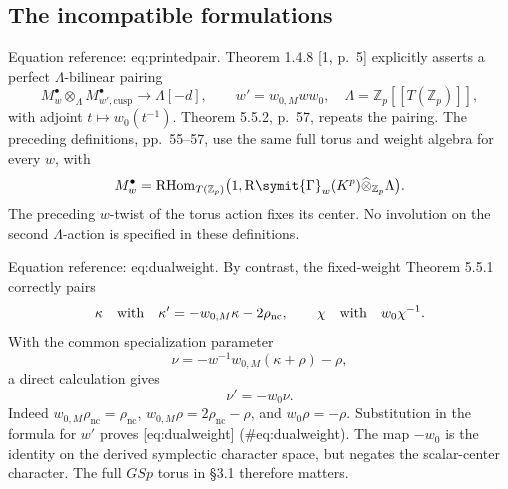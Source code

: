 \documentclass[10pt]{article}
\begin{document}
\subsection*{The incompatible formulations}
Equation reference: eq:printedpair. Theorem 1.4.8 [1, p. 5] explicitly asserts a perfect \(\Lambda\)-bilinear pairing \[
 M_w^\bullet\otimes_\Lambda M_{w',\mathrm{cusp}}^\bullet
 \longrightarrow\Lambda[-d],
 \qquad w'=w_{0,M}ww_0,\quad
 \Lambda=\mathbb Z_p[[T(\mathbb Z_p)]],\] with adjoint \(t\mapsto w_0(t^{-1})\). Theorem 5.5.2, p. 57, repeats the pairing. The preceding definitions, pp. 55–57, use the same full torus and weight algebra for every \(w\), with \[M_w^\bullet=\operatorname{RHom}_{T(\mathbb Z_p)}
 \bigl(1,\operatorname{R\symit{\Gamma}}_w(K^p)\widehat\otimes_{\mathbb Z_p}\Lambda\bigr).\] The preceding \(w\)-twist of the torus action fixes its center. No involution on the second \(\Lambda\)-action is specified in these definitions.\par
Equation reference: eq:dualweight. By contrast, the fixed-weight Theorem 5.5.1 correctly pairs \[\kappa \quad\hbox{with}\quad
 \kappa'=-w_{0,M}\kappa-2\rho_{\mathrm{nc}},
 \qquad \chi\quad\hbox{with}\quad w_0\chi^{-1}.\] With the common specialization parameter \[\nu=-w^{-1}w_{0,M}(\kappa+\rho)-\rho,\] a direct calculation gives \[
 \nu'=-w_0\nu.\] Indeed \(w_{0,M}\rho_{\mathrm{nc}}=\rho_{\mathrm{nc}}\), \(w_{0,M}\rho=2\rho_{\mathrm{nc}}-\rho\), and \(w_0\rho=-\rho\). Substitution in the formula for \(w'\) proves [eq:dualweight] (\#eq:dualweight). The map \(-w_0\) is the identity on the derived symplectic character space, but negates the scalar-center character. The full \(GSp\) torus in §3.1 therefore matters.\par
\end{document}
